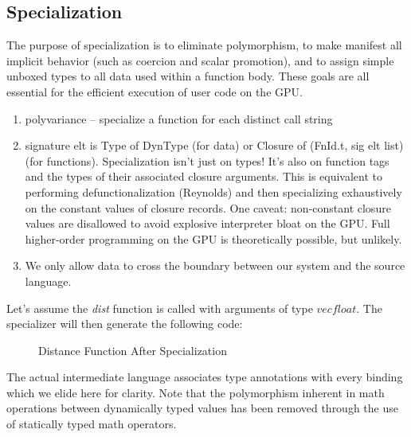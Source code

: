 \documentclass[preprint]{sigplanconf}
\begin{document}
\subsection{Specialization}
The purpose of specialization is to eliminate polymorphism, to make manifest all implicit behavior (such as coercion and scalar promotion), and to assign simple unboxed types to all data used within a function body. These goals are all essential for the efficient execution of user code on the GPU. 
\begin{enumerate}
\item polyvariance -- specialize a function for each distinct call string
\item signature elt is Type of DynType (for data) or Closure of (FnId.t, sig elt list) (for functions). Specialization isn't just on types! It's also on function tags and the types of their associated closure arguments. This is equivalent to performing defunctionalization (Reynolds) and then specializing exhaustively on the constant values of closure records. One caveat: non-constant closure values are disallowed to avoid explosive interpreter bloat on the GPU. Full higher-order programming on the GPU is theoretically possible, but unlikely. 
\item We only allow data to cross the boundary between our system and the source language. 
\end{enumerate}
Let's assume the \textit{dist} function is called with arguments of type $vec float$. The specializer will then generate the following code: 
\begin{figure}[h!]
\caption{Distance Function After Specialization}
\end{figure}
The actual intermediate language associates type annotations with every binding which we elide here for clarity. Note that the polymorphism inherent in math operations between dynamically typed values has been removed through the use of statically typed math operators. 
\end{document}

